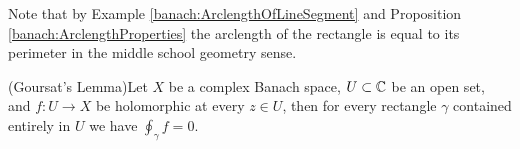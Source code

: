 Note that by Example \ref{banach:ArclengthOfLineSegment} and Proposition \ref{banach:ArclengthProperties} the arclength of the rectangle is equal to its perimeter in the middle school geometry sense.


\begin{lem}(Goursat's Lemma)\label{banach:GoursatLemma}Let $X$ be a complex Banach space, $U \subset \mathbb{C}$ be an open set, and $f : U \to X$ be holomorphic at every $z \in U$, then for every rectangle $\gamma$ contained entirely in $U$ we have $\oint_\gamma f = 0$.   
\end{lem}
